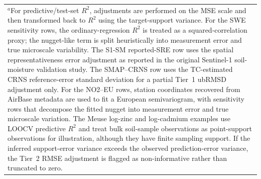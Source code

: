 \begin{table}[t]
\begin{tabular}{p{} p{} p{} p{} p{} p{}}
\multicolumn{6}{p{0.96\textwidth}}{\footnotesize $^{a}$For predictive/test-set $R^2$, adjustments are performed on the MSE scale and then transformed back to $R^2$ using the target-support variance. For the SWE sensitivity rows, the ordinary-regression $R^2$ is treated as a squared-correlation proxy; the nugget-like term is split heuristically into measurement error and true microscale variability. The S1-SM reported-SRE row uses the spatial representativeness error adjustment as reported in the original Sentinel-1 soil-moisture validation study. The SMAP--CRNS row uses the TC-estimated CRNS reference-error standard deviation for a partial Tier~1 ubRMSD adjustment only. For the NO2--EU rows, station coordinates recovered from AirBase metadata are used to fit a European semivariogram, with sensitivity rows that decompose the fitted nugget into measurement error and true microscale variation. The Meuse log-zinc and log-cadmium examples use LOOCV predictive $R^2$ and treat bulk soil-sample observations as point-support observations for illustration, although they have finite sampling support. If the inferred support-error variance exceeds the observed prediction-error variance, the Tier~2 RMSE adjustment is flagged as non-informative rather than truncated to zero.} \\
\end{tabular}
\end{table}
